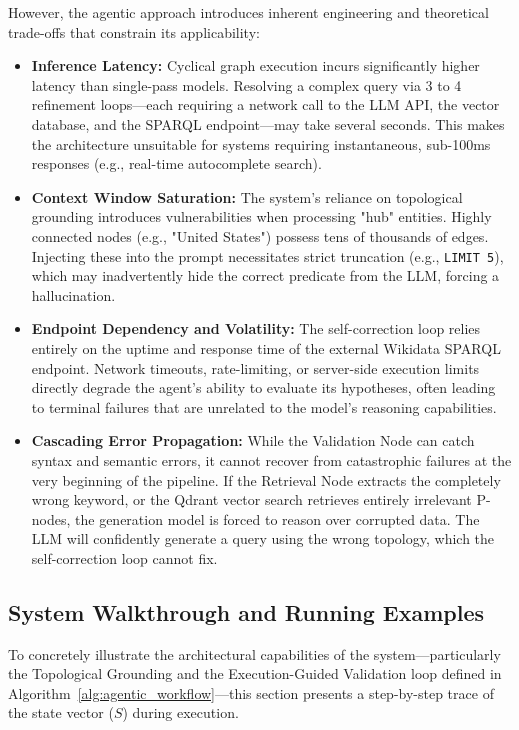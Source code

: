However, the agentic approach introduces inherent engineering and theoretical trade-offs that constrain its applicability:

\begin{itemize}
    \item \textbf{Inference Latency:} Cyclical graph execution incurs significantly higher latency than single-pass models. Resolving a complex query via 3 to 4 refinement loops—each requiring a network call to the LLM API, the vector database, and the SPARQL endpoint—may take several seconds. This makes the architecture unsuitable for systems requiring instantaneous, sub-100ms responses (e.g., real-time autocomplete search).
    \item \textbf{Context Window Saturation:} The system's reliance on topological grounding introduces vulnerabilities when processing "hub" entities. Highly connected nodes (e.g., "United States") possess tens of thousands of edges. Injecting these into the prompt necessitates strict truncation (e.g., \texttt{LIMIT 5}), which may inadvertently hide the correct predicate from the LLM, forcing a hallucination.
    \item \textbf{Endpoint Dependency and Volatility:} The self-correction loop relies entirely on the uptime and response time of the external Wikidata SPARQL endpoint. Network timeouts, rate-limiting, or server-side execution limits directly degrade the agent's ability to evaluate its hypotheses, often leading to terminal failures that are unrelated to the model's reasoning capabilities.
    \item \textbf{Cascading Error Propagation:} While the Validation Node can catch syntax and semantic errors, it cannot recover from catastrophic failures at the very beginning of the pipeline. If the Retrieval Node extracts the completely wrong keyword, or the Qdrant vector search retrieves entirely irrelevant P-nodes, the generation model is forced to reason over corrupted data. The LLM will confidently generate a query using the wrong topology, which the self-correction loop cannot fix.
\end{itemize}

\subsection{System Walkthrough and Running Examples}
\label{sec:system_walkthrough}
To concretely illustrate the architectural capabilities of the system—particularly the Topological Grounding and the Execution-Guided Validation loop defined in Algorithm~\ref{alg:agentic_workflow}—this section presents a step-by-step trace of the state vector ($S$) during execution.

